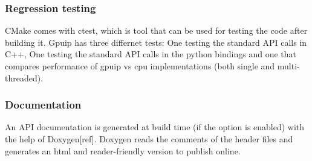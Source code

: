 \subsubsection{Regression testing}
CMake comes with ctest, which is tool that can be used for testing the code after building it. Gpuip has three differnet tests: One testing the standard API calls in C++, One testing the standard API calls in the python bindings and one that compares performance of gpuip vs cpu implementations (both single and multi-threaded).

\subsubsection{Documentation}
An API documentation is generated at build time (if the option is enabled) with the help of Doxygen[ref]. Doxygen reads the comments of the header files and generates an html and reader-friendly version to publish online. 
